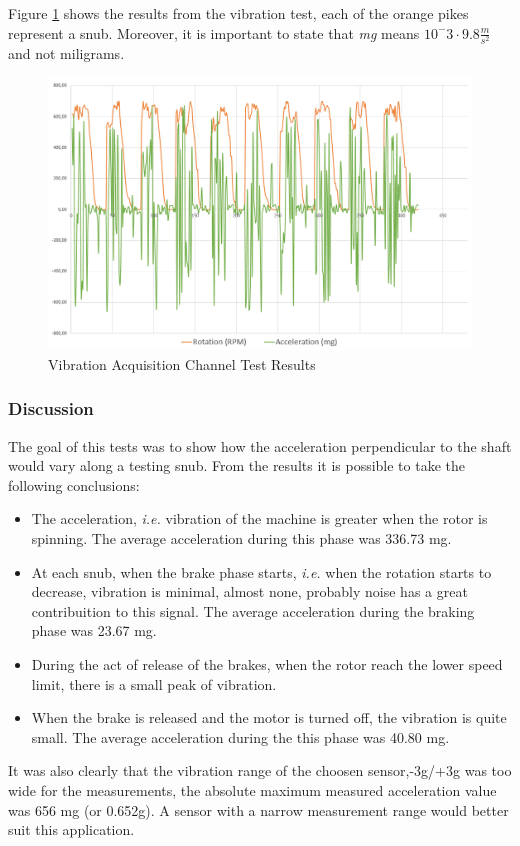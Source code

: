 		Figure \ref{fig:test-vibration} shows the results from the vibration test, each of the orange pikes represent a snub. Moreover, it is important to state that \textit{mg} means $10^-3 \cdot 9.8 \frac{m}{s^2}$ and not miligrams.

		\begin{figure}[htbp]
			\centering
			\includegraphics[width=.8\textwidth]{figuras/fig-test-vibration}
			\caption{Vibration Acquisition Channel Test Results}
			\label{fig:test-vibration}
		\end{figure}

	\subsubsection{Discussion}

		The goal of this tests was to show how the acceleration perpendicular to the shaft would vary along a testing snub. From the results it is possible to take the following conclusions:

		\begin{itemize}
			\item The acceleration, \textit{i.e.} vibration of the machine is greater when the rotor is spinning. The average acceleration during this phase was 336.73 mg.
			\item At each snub, when the brake phase starts, \textit{i.e.} when the rotation starts to decrease, vibration is minimal, almost none, probably noise has a great contribuition to this signal. The average acceleration during the braking phase was 23.67 mg.
			\item During the act of release of the brakes, when the rotor reach the lower speed limit, there is a small peak of vibration.
			\item When the brake is released and the motor is turned off, the vibration is quite small. The average acceleration during the this phase was 40.80 mg.
		\end{itemize}

		It was also clearly that the vibration range of the choosen sensor,-3g/+3g \cite{devices2010adxl335} was too wide for the measurements, the absolute maximum measured acceleration value was 656 mg (or 0.652g). A sensor with a narrow measurement range would better suit this application.